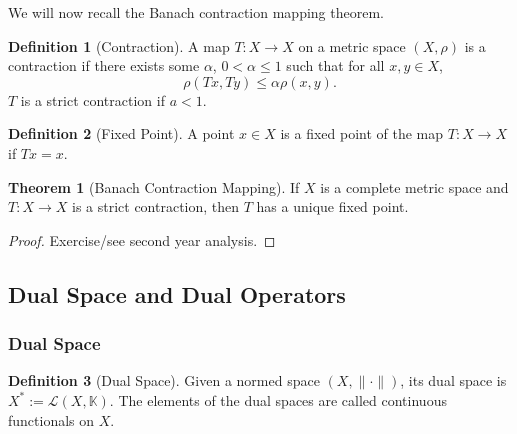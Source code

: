 \documentclass[]{article}
\theoremstyle{definition}
\newtheorem{theorem}{Theorem}
\theoremstyle{definition}
\newtheorem{definition}{Definition}[section]
\begin{document}
We will now recall the Banach contraction mapping theorem.

\begin{definition}[Contraction]
  A map \(T : X \to X\) on a metric space \((X, \rho)\) is a contraction if 
  there exists some \(\alpha\), \(0 < \alpha \le 1\) such that for all 
  \(x, y \in X\), 
  \[\rho(Tx, Ty) \le \alpha \rho(x, y).\]
  \(T\) is a strict contraction if \(a < 1\).
\end{definition}

\begin{definition}[Fixed Point]
  A point \(x \in X\) is a fixed point of the map \(T : X \to X\) if \(Tx = x\).
\end{definition}

\begin{theorem}[Banach Contraction Mapping]
  If \(X\) is a complete metric space and \(T : X \to X\) is a strict contraction,
  then \(T\) has a unique fixed point.
\end{theorem}
\begin{proof}
  Exercise/see second year analysis.
\end{proof}

\subsection{Dual Space and Dual Operators}

\subsubsection{Dual Space}

\begin{definition}[Dual Space]
  Given a normed space \((X, \| \cdot \|)\), its dual space is 
  \(X^* := \mathcal{L}(X, \mathbb{K})\). The elements of the dual spaces are 
  called continuous functionals on \(X\).
\end{definition}
\end{document}
